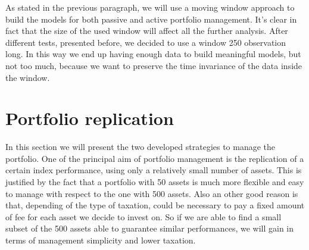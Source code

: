 \documentclass{article}%
\begin{document}
As stated in the previous paragraph, we will use a moving window approach to build the models for both passive and active portfolio management. It's clear in fact that the size of the used window will affect all the further analysis. After different tests, presented before, we decided to use a window 250 observation long. In this way we end up having enough data to build meaningful models, but not too much, because we want to preserve the time invariance of the data inside the window.





\newpage
\section{Portfolio replication}
In this section we will present the two developed strategies to manage the portfolio. 
One of  the principal aim of portfolio management is the replication of a certain index performance, using only a relatively small number of assets. This is justified by the fact that a portfolio with 50 assets is much more flexible and easy to manage with respect to the one with 500 assets. Also an other good reason is that, depending of the type of taxation, could be necessary to pay a fixed amount of fee for each asset we decide to invest on. So if we are able to find a small subset of the 500 assets able to guarantee similar performances, we will gain in terms of management simplicity and lower taxation.
\end{document}
